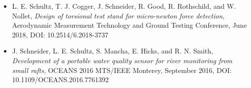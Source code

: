 \begin{itemize}
    \item L. E. Schultz, T. J. Cogger, J. Schneider, R. Good, R. Rothschild, and W. Nollet, \textit{Design of torsional test stand for micro-newton force detection}, Aerodynamic Measurement Technology and Ground Testing Conference, June 2018, DOI: 10.2514/6.2018-3737
    \item J. Schneider, L. E. Schultz, S. Mancha, E. Hicks, and R. N. Smith, \textit{Development of a portable water quality sensor for river monitoring from small rafts}, OCEANS 2016 MTS/IEEE Monterey, September 2016, DOI: 10.1109/OCEANS.2016.7761392
\end{itemize}

